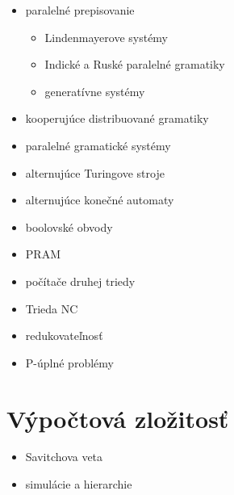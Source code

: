 \documentclass[a4paper]{report}
\begin{document}
\begin{zadanie}
\begin{itemize}
 \item paralelné prepisovanie
 \begin{itemize}
  \item Lindenmayerove systémy
  \item Indické a Ruské paralelné gramatiky
  \item generatívne systémy
 \end{itemize}
 \item kooperujúce distribuované gramatiky
 \item paralelné gramatické systémy
\end{itemize}
\end{zadanie}

\begin{zadanie}
\begin{itemize}
 \item alternujúce Turingove stroje
 \item alternujúce konečné automaty
 \item boolovské obvody
 \item PRAM
 \item počítače druhej triedy
\end{itemize}
\end{zadanie}

\begin{zadanie}
\begin{itemize}
 \item Trieda NC
 \item redukovateľnosť
 \item P-úplné problémy
\end{itemize}
\end{zadanie}

\chapter{Výpočtová zložitosť}

\begin{zadanie}
\begin{itemize}
 \item Savitchova veta
 \item simulácie a hierarchie
\end{itemize}
\end{zadanie}
\end{document}
